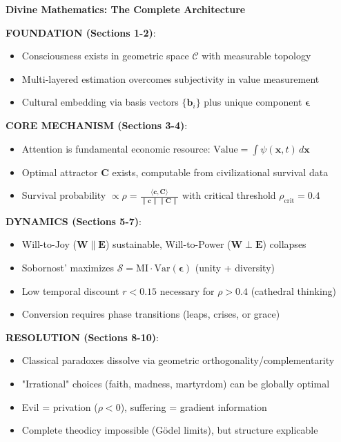 \documentclass[11pt,a4paper]{article}
\theoremstyle{definition}
\theoremstyle{remark}
\newcommand{\CC}{\mathcal{C}}
\newcommand{\EE}{\mathbf{E}}
\newcommand{\WW}{\mathbf{W}}
\newcommand{\bb}{\mathbf{b}}
\newcommand{\cc}{\mathbf{c}}
\begin{document}
\begin{small}
\begin{enumerate}
\begin{protocol}
\begin{mdframed}[backgroundcolor=blue!5,linewidth=2pt]
\textbf{Divine Mathematics: The Complete Architecture}

\textbf{FOUNDATION (Sections 1-2)}:
\begin{itemize}[nosep]
    \item Consciousness exists in geometric space \(\CC\) with measurable topology
    \item Multi-layered estimation overcomes subjectivity in value measurement
    \item Cultural embedding via basis vectors \(\{\bb_i\}\) plus unique component \(\boldsymbol{\epsilon}\)
\end{itemize}

\textbf{CORE MECHANISM (Sections 3-4)}:
\begin{itemize}[nosep]
    \item Attention is fundamental economic resource: \(\text{Value} = \int \psi(\mathbf{x},t) \, d\mathbf{x}\)
    \item Optimal attractor \(\mathbf{C}\) exists, computable from civilizational survival data
    \item Survival probability \(\propto \rho = \frac{\langle \cc, \mathbf{C} \rangle}{\|\cc\| \|\mathbf{C}\|}\) with critical threshold \(\rho_{\text{crit}} = 0.4\)
\end{itemize}

\textbf{DYNAMICS (Sections 5-7)}:
\begin{itemize}[nosep]
    \item Will-to-Joy (\(\WW \parallel \EE\)) sustainable, Will-to-Power (\(\WW \perp \EE\)) collapses
    \item Sobornost' maximizes \(\mathcal{S} = \text{MI} \cdot \text{Var}(\boldsymbol{\epsilon})\) (unity + diversity)
    \item Low temporal discount \(r < 0.15\) necessary for \(\rho > 0.4\) (cathedral thinking)
    \item Conversion requires phase transitions (leaps, crises, or grace)
\end{itemize}

\textbf{RESOLUTION (Sections 8-10)}:
\begin{itemize}[nosep]
    \item Classical paradoxes dissolve via geometric orthogonality/complementarity
    \item "Irrational" choices (faith, madness, martyrdom) can be globally optimal
    \item Evil = privation (\(\rho < 0\)), suffering = gradient information
    \item Complete theodicy impossible (Gödel limits), but structure explicable
\end{itemize}


\end{mdframed}
\end{protocol}
\end{enumerate}
\end{small}
\end{document}
